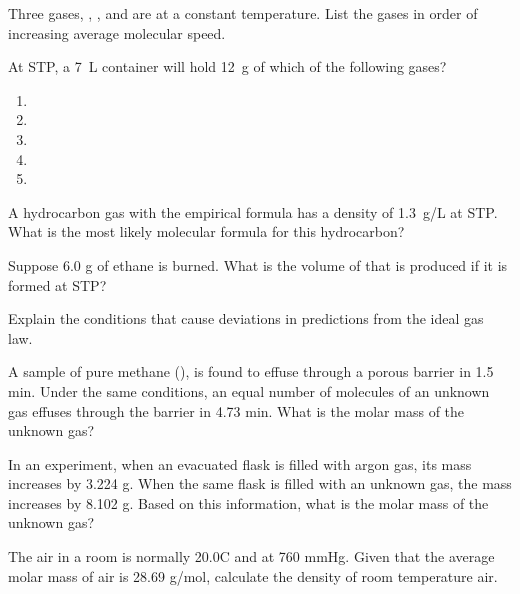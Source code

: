 \begin{problem}
Three gases, , , and  are at a constant temperature. List the gases in order of increasing average molecular speed.
\end{problem}

\clearpage
\begin{problem}
At STP, a \SI{7}{\L} container will hold \SI{12}{\g} of which of the following gases?
\begin{enumerate}[label=(\alph*)]
\item {}
\item {}
\item {}
\item {}
\item {}
\end{enumerate}
\end{problem}

\begin{problem}
A hydrocarbon gas with the empirical formula  has a density of \SI{1.3}{\g/\L} at STP. What is the most likely molecular formula for this hydrocarbon?
\end{problem}

\begin{problem}
Suppose 6.0 g of ethane is burned. What is the volume of  that is produced if it is formed at STP?
\end{problem}

\begin{problem}
Explain the conditions that cause deviations in predictions from the ideal gas law.
\end{problem}

\begin{problem}
A sample of pure methane (), is found to effuse through a porous barrier in 1.5 min. Under the same conditions, an equal number of molecules of an unknown gas effuses through the barrier in 4.73 min. What is the molar mass of the unknown gas?
\end{problem}

\begin{problem}
In an experiment, when an evacuated flask is filled with argon gas, its mass increases by 3.224 g. When the same flask is filled with an unknown gas, the mass increases by 8.102 g. Based on this information, what is the molar mass of the unknown gas?
\end{problem}

\begin{problem}
The air in a room is normally 20.0\degree C and at 760 mmHg. Given that the average molar mass of air is 28.69 g/mol, calculate the density of room temperature air.
\end{problem}

